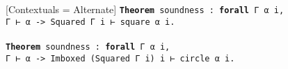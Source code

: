 \vspace{0.5\baselineskip}
\begin{tcolorbox}[enhanced jigsaw, breakable, sharp corners, colframe=black, colback=white, boxrule=0.5pt, left=1.5mm, right=1.5mm, top=1.5mm, bottom=1.5mm]
\setmonofont{Fira Code}[Contextuals = Alternate]
\texttt{\noindent\footnotesize\textbf{Theorem} soundness : \textbf{forall} Γ α i,\\Γ ⊢ α -> Squared Γ i ⊢ square α i.\\
\\
\textbf{Theorem} soundness : \textbf{forall} Γ α i,\\Γ ⊢ α -> Imboxed (Squared Γ i) i ⊢ circle α i.
}
\end{tcolorbox}
